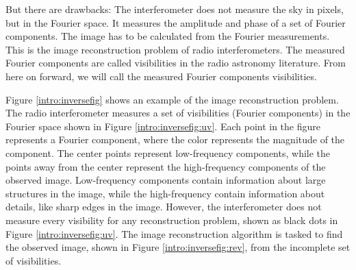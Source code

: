 But there are drawbacks: The interferometer does not measure the sky in pixels, but in the Fourier space. It measures the amplitude and phase of a set of Fourier components. The image has to be calculated from the Fourier measurements. This is the image reconstruction problem of radio interferometers. The measured Fourier components are called visibilities in the radio astronomy literature. From here on forward, we will call the measured Fourier components visibilities.

Figure \ref{intro:inversefig} shows an example of the image reconstruction problem. The radio interferometer measures a set of visibilities (Fourier components) in the Fourier space shown in Figure \ref{intro:inversefig:uv}. Each point in the figure represents a Fourier component, where the color represents the magnitude of the component. The center points represent low-frequency components, while the points away from the center represent the high-frequency components of the observed image. Low-frequency components contain information about large structures in the image, while the high-frequency contain information about details, like sharp edges in the image. However, the interferometer does not measure every visibility for any reconstruction problem, shown as black dots in Figure \ref{intro:inversefig:uv}. The image reconstruction algorithm is tasked to find the observed image, shown in Figure \ref{intro:inversefig:rev}, from the incomplete set of visibilities. 

